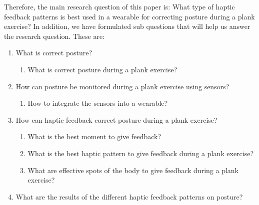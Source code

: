 \documentclass[sigconf]{acmart}
\begin{document}
Therefore, the main research question of this paper is: What type of haptic feedback patterns is best used in a wearable for correcting posture during a plank exercise? In addition, we have formulated sub questions that will help us answer the research question. These are:
\begin{enumerate}
\item What is correct posture? 
	\begin{enumerate}
		 \item What is correct posture during a plank exercise?
 	\end{enumerate}
\item How can posture be monitored during a plank exercise using sensors?
	\begin{enumerate}
		\item	How to integrate the sensors into a wearable?
	\end{enumerate}
\item How can haptic feedback correct posture during a plank exercise?
	\begin{enumerate}
		\item What is the best moment to give feedback?
 		\item What is the best haptic pattern to give feedback during a plank exercise?
 		\item What are effective spots of the body to give feedback during a plank exercise?
 	\end{enumerate}
\item What are the results of the different haptic feedback patterns on posture?
\end{enumerate}
\end{document}
